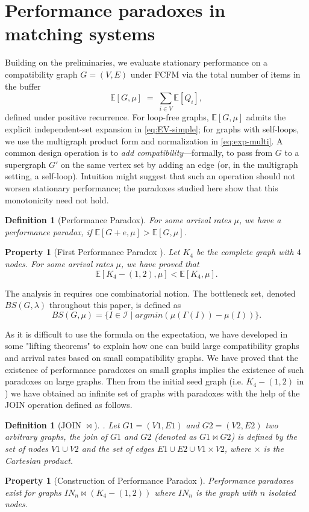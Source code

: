 \documentclass[11pt]{article}
\newtheorem{property}[theorem]{Property}
\newtheorem{definition}[theorem]{Definition}
\begin{document}
\section{Performance paradoxes in matching systems}\label{sec:def-paradox}

Building on the preliminaries, we evaluate stationary performance on a compatibility graph $G=(V,E)$ under \textsc{FCFM} via the total number of items in the buffer
\[
\mathbb{E}[G,\mu]\;=\;\sum_{i\in V}\mathbb{E}[Q_i],
\]
defined under positive recurrence. For loop-free graphs, $\mathbb{E}[G,\mu]$ admits the explicit independent-set expansion in \eqref{eq:EV-simple}; for graphs with self-loops, we use the multigraph product form and normalization in \eqref{eq:exp-multi}. A common design operation is to \emph{add compatibility}—formally, to pass from $G$ to a supergraph $G'$ on the same vertex set by adding an edge (or, in the multigraph setting, a self-loop). Intuition might suggest that such an operation should not worsen stationary performance; the paradoxes studied here show that this monotonicity need not hold.

\begin{definition} [Performance Paradox] 
	For some arrival rates $\mu$, we have a performance paradox, if  $\mathbb{E} [G+e, \mu]  > \mathbb{E} [G, \mu] $. 
\end{definition}

\begin{property} [First Performance Paradox \cite{CDFB21}]  
	Let $K_4$ be the complete graph with $4$ nodes.
	For some arrival rates $\mu$, we have proved that  $$\mathbb{E} [K_4-(1,2), \mu]  < \mathbb{E} [K_4, \mu] .$$ 
\end{property}


The analysis in \cite{CDFB21} requires one combinatorial notion. The {bottleneck set}, denoted $BS(G,\lambda)$ throughout this paper, is defined as
\[
BS (G,\mu) =\{I \in \mathcal{I}\mid argmin(\mu(\Gamma(I))-\mu(I))\}.
\]

As it is difficult to use the formula on the expectation, we have developed in \cite{BCDF24} some "lifting theorems" to
explain how one can build large compatibility graphs and arrival rates based on small compatibility graphs. We have 
proved that the existence of performance paradoxes on small graphs implies the existence of such paradoxes 
on large graphs. Then from the initial seed graph (i.e. $K_4-(1,2)$ in \cite{CDFB21}) 
we have obtained an infinite set of graphs with paradoxes with the help of the JOIN operation defined as follows. 
\begin{definition} [JOIN $\bowtie$]. Let $G1=(V1,E1) $ and  $G2=(V2,E2) $ two arbitrary graphs, 
	the join of $G1$ and $G2$ (denoted as $G1 \bowtie G2$) is defined by the set of nodes $V1 \cup V2$ and the set 
	of edges $E1 \cup E2 \cup V1 \times V2$, where $\times $ is the Cartesian product.  
\end{definition} 
\begin{property} [Construction of Performance Paradox \cite{BCDF24}] 
	\label{family}
	Performance paradoxes exist for graphs $IN_n \bowtie (K_4 -(1,2)) $ where $ IN_n$ is the graph with $n$ isolated nodes.   
\end{property}
\end{document}
